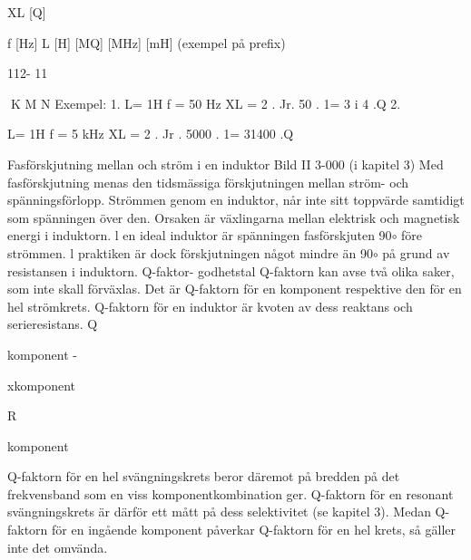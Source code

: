 XL [Q]

f [Hz] L [H]
[MQ]
[MHz] [mH]
(exempel på prefix)

112- 11

K M N
Exempel:
1.
L= 1H
f = 50 Hz
XL = 2 . Jr. 50 . 1= 3 i 4 .Q
2.

L= 1H
f = 5 kHz
XL = 2 . Jr . 5000 . 1= 31400 .Q

Fasförskjutning mellan
och
ström i en induktor
Bild II 3-000 (i kapitel 3)
Med fasförskjutning menas den tidsmässiga förskjutningen mellan ström- och
spänningsförlopp. Strömmen genom en induktor, når inte sitt toppvärde samtidigt som
spänningen över den. Orsaken är växlingarna mellan elektrisk och magnetisk energi i
induktorn.
l en ideal induktor är spänningen fasförskjuten 90$\circ$ före strömmen. l praktiken är
dock förskjutningen något mindre än 90$\circ$ på
grund av resistansen i induktorn.
Q-faktor- godhetstal
Q-faktorn kan avse två olika saker, som inte
skall förväxlas. Det är Q-faktorn för en komponent respektive den för en hel strömkrets.
Q-faktorn för en induktor är kvoten av
dess reaktans och serieresistans.
Q

komponent -

xkomponent

R

komponent

Q-faktorn för en hel svängningskrets beror däremot på bredden på det frekvensband som en viss komponentkombination
ger. Q-faktorn för en resonant svängningskrets är därför ett mått på dess selektivitet
(se kapitel 3).
Medan Q-faktorn för en ingående komponent påverkar Q-faktorn för en hel krets,
så gäller inte det omvända.

